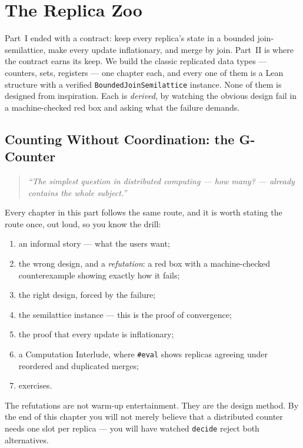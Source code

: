 \documentclass[12pt, a4paper, openright]{book}
\theoremstyle{thmstyle}
\theoremstyle{defstyle}
\newcommand{\lc}[1]{\texttt{#1}}
\newcounter{exercise}[chapter]
\newcounter{refutation}[chapter]
\begin{document}
\part{The Replica Zoo}

Part~I ended with a contract: keep every replica's state in a bounded
join-semilattice, make every update inflationary, and merge by join.
Part~II is where the contract earns its keep. We build the classic
replicated data types --- counters, sets, registers --- one chapter each,
and every one of them is a Lean structure with a verified
\lc{BoundedJoinSemilattice} instance. None of them is designed from
inspiration. Each is \emph{derived}, by watching the obvious design fail
in a machine-checked red box and asking what the failure demands.

\chapter{Counting Without Coordination: the G-Counter}
\label{ch:gcounter}

\begin{quote}
  \itshape
  ``The simplest question in distributed computing --- \emph{how many?} ---
  already contains the whole subject.''
\end{quote}

Every chapter in this part follows the same route, and it is worth
stating the route once, out loud, so you know the drill:

\begin{enumerate}[nosep]
  \item an informal story --- what the users want;
  \item the wrong design, and a \emph{refutation}: a red box with a
    machine-checked counterexample showing exactly how it fails;
  \item the right design, forced by the failure;
  \item the semilattice instance --- this is the proof of convergence;
  \item the proof that every update is inflationary;
  \item a Computation Interlude, where \texttt{\#eval} shows replicas
    agreeing under reordered and duplicated merges;
  \item exercises.
\end{enumerate}

The refutations are not warm-up entertainment. They are the design
method. By the end of this chapter you will not merely believe that a
distributed counter needs one slot per replica --- you will have watched
\lc{decide} reject both alternatives.
\end{document}
